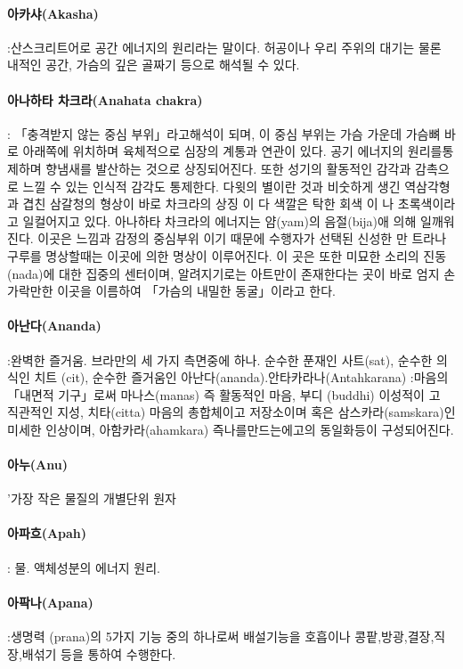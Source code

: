 \documentclass[12pt, a4paper, oneside]{book}
\begin{document}
\paragraph{아카샤(Akasha)} :산스크리트어로 공간 에너지의 원리라는 말이다. 허공이나 우리 주위의 대기는 물론 내적인 공간, 가슴의 깊은 골짜기 등으로 해석될 수 있다.

\paragraph{아나하타 차크라(Anahata chakra)} : 「충격받지 않는 중심 부위」라고해석이 되며, 이 중심 부위는 가슴 가운데 가슴뼈 바로 아래쪽에 위치하며 육체적으로 심장의 계통과 연관이 있다. 공기 에너지의 원리를통제하며 향냄새를 발산하는 것으로 상징되어진다. 또한 성기의 활동적인 감각과 감촉으로 느낄 수 있는 인식적 감각도 통제한다. 다윗의 별이란 것과 비숫하게 생긴 역삼각형과 겹친 삼갈청의 형상이 바로 차크라의 상징 이 다 색깔은 탁한 회색 이 나 초록색이라고 일컬어지고 있다. 아나하타 차크라의 에너지는 얌(yam)의 음절(bija)애 의해 일깨워진다. 이곳은 느낌과 감정의 중심부위 이기 때문에 수행자가 선택된 신성한 만  트라나 구루를 명상할때는 이곳에 의한 명상이 이루어진다. 이 곳은 또한 미묘한 소리의 진동 (nada)에 대한 집중의 센터이며, 알려지기로는 아트만이 존재한다는 곳이 바로 엄지 손가락만한 이곳을 이름하여 「가슴의 내밀한 동굴」이라고 한다.

\paragraph{아난다(Ananda)} :완벽한 즐거움. 브라만의 세 가지 측면중에 하나. 순수한 푼재인 사트(sat), 순수한 의식인 치트 (cit), 순수한 즐거움인 아난다(ananda).안타카라나(Antahkarana) :마음의 「내면적 기구」로써 마나스(manas) 즉 활동적인 마음, 부디 (buddhi) 이성적이  고 직관적인 지성, 치타(citta) 마음의 총합체이고 저장소이며 혹은 삼스카라(samskara)인 미세한 인상이며, 아함카라(ahamkara) 즉나를만드는에고의 동일화등이 구성되어진다.

\paragraph{아누(Anu)} '가장 작은 물질의 개별단위 원자

\paragraph{아파흐(Apah)} : 물. 액체성분의 에너지 원리.

\paragraph{아팍나(Apana)} :생명력 (prana)의 5가지 기능 중의 하나로써 배설기능을 호흡이나 콩팥,방광,결장,직장,배섞기 등을 통하여 수행한다.
\end{document}
